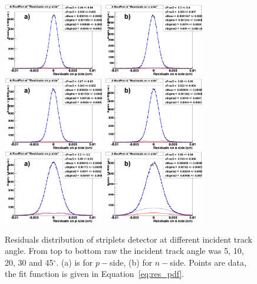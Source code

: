 \begin{figure}[!htpb]
\includegraphics[width=0.39\textwidth]{res_pside_20deg.pdf}
\includegraphics[width=0.39\textwidth]{res_nside_20deg.pdf}
\includegraphics[width=0.39\textwidth]{res_pside_30deg.pdf}
\includegraphics[width=0.39\textwidth]{res_nside_30deg.pdf}
\includegraphics[width=0.39\textwidth]{res_pside_45deg.pdf}
\includegraphics[width=0.39\textwidth]{res_nside_45deg.pdf}
\caption{\label{fig:res_angles}Residuals distribution of striplets detector at different incident track angle. From top to bottom raw the incident track angle was 5, 10, 20, 30 and 45$^{\circ}$. 
(a) is for $p-$side, (b) for $n-$side. Points are data, the fit function is given in Equation~\ref{eq:res_pdf}.}
\end{figure}


